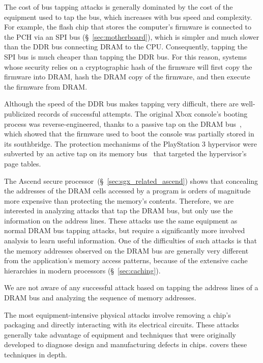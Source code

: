 The cost of bus tapping attacks is generally dominated by the cost of the
equipment used to tap the bus, which increases with bus speed and complexity.
For example, the flash chip that stores the computer's firmware is connected to
the PCH via an SPI bus (\S~\ref{sec:motherboard}), which is simpler and much
slower than the DDR bus connecting DRAM to the CPU. Consequently, tapping the
SPI bus is much cheaper than tapping the DDR bus. For this reason, systems
whose security relies on a cryptographic hash of the firmware will first copy
the firmware into DRAM, hash the DRAM copy of the firmware, and then execute
the firmware from DRAM.

Although the speed of the DDR bus makes tapping very difficult, there are
well-publicized records of successful attempts. The original Xbox console's
booting process was reverse-engineered, thanks to a passive tap on the DRAM
bus~\cite{huang2003xbox}, which showed that the firmware used to boot the
console was partially stored in its southbridge. The protection mechanisms of
the PlayStation 3 hypervisor were subverted by an active tap on its memory
bus~\cite{hotz2010ps3} that targeted the hypervisor's page tables.

The Ascend secure processor~(\S~\ref{sec:sgx_related_ascend}) shows that
concealing the addresses of the DRAM cells accessed by a program is orders of
magnitude more expensive than protecting the memory's contents. Therefore, we
are interested in analyzing attacks that tap the DRAM bus, but only use the
information on the address lines. These attacks use the same equipment as
normal DRAM bus tapping attacks, but require a significantly more involved
analysis to learn useful information. One of the difficulties of such attacks
is that the memory addresses observed on the DRAM bus are generally very
different from the application's memory access patterns, because of the
extensive cache hierarchies in modern processors (\S~\ref{sec:caching}).

We are not aware of any successful attack based on tapping the address lines of
a DRAM bus and analyzing the sequence of memory addresses.


\label{sec:physical_chip_attacks}

The most equipment-intensive physical attacks involve removing a chip's
packaging and directly interacting with its electrical circuits. These attacks
generally take advantage of equipment and techniques that were originally
developed to diagnose design and manufacturing defects in chips.
\cite{beck1998integrated} covers these techniques in depth.

